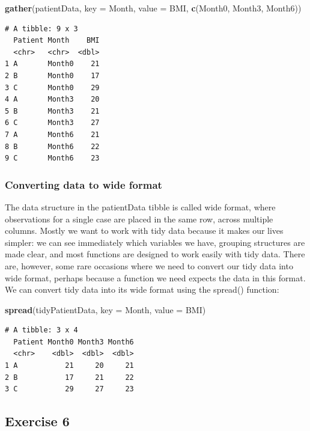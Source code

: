 \documentclass[
]{article}
\newenvironment{Shaded}{\begin{snugshade}}{\end{snugshade}}
\newcommand{\AttributeTok}[1]{\textcolor[rgb]{0.13,0.29,0.53}{#1}}
\newcommand{\FunctionTok}[1]{\textcolor[rgb]{0.13,0.29,0.53}{\textbf{#1}}}
\newcommand{\NormalTok}[1]{#1}
\begin{document}
\begin{Shaded}
\begin{Highlighting}[]
\FunctionTok{gather}\NormalTok{(patientData, }\AttributeTok{key =}\NormalTok{ Month, }\AttributeTok{value =}\NormalTok{ BMI, }\FunctionTok{c}\NormalTok{(Month0, Month3, Month6))}
\end{Highlighting}
\end{Shaded}

\begin{verbatim}
# A tibble: 9 x 3
  Patient Month    BMI
  <chr>   <chr>  <dbl>
1 A       Month0    21
2 B       Month0    17
3 C       Month0    29
4 A       Month3    20
5 B       Month3    21
6 C       Month3    27
7 A       Month6    21
8 B       Month6    22
9 C       Month6    23
\end{verbatim}

\subsubsection{Converting data to wide
format}\label{converting-data-to-wide-format}

The data structure in the patientData tibble is called wide format,
where observations for a single case are placed in the same row, across
multiple columns. Mostly we want to work with tidy data because it makes
our lives simpler: we can see immediately which variables we have,
grouping structures are made clear, and most functions are designed to
work easily with tidy data. There are, however, some rare occasions
where we need to convert our tidy data into wide format, perhaps because
a function we need expects the data in this format. We can convert tidy
data into its wide format using the spread() function:

\begin{Shaded}
\begin{Highlighting}[]
\FunctionTok{spread}\NormalTok{(tidyPatientData, }\AttributeTok{key =}\NormalTok{ Month, }\AttributeTok{value =}\NormalTok{ BMI)}
\end{Highlighting}
\end{Shaded}

\begin{verbatim}
# A tibble: 3 x 4
  Patient Month0 Month3 Month6
  <chr>    <dbl>  <dbl>  <dbl>
1 A           21     20     21
2 B           17     21     22
3 C           29     27     23
\end{verbatim}

\subsection{Exercise 6}\label{exercise-6}
\end{document}
